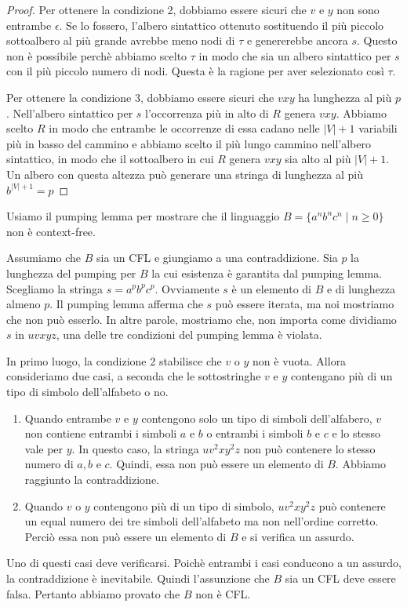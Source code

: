 \documentclass[12pt]{report}
\newcounter{lemma}
\begin{document}
\begin{proof}
Per ottenere la condizione 2, dobbiamo essere sicuri che $v$ e $y$ non sono entrambe $\epsilon$. Se lo fossero, l'albero sintattico ottenuto sostituendo il più piccolo sottoalbero al più grande avrebbe meno nodi di $\tau$ e genererebbe ancora $s$. Questo non è possibile perchè abbiamo scelto $\tau$ in modo che sia un albero sintattico per $s$ con il più piccolo numero di nodi. Questa è la ragione per aver selezionato così $\tau$.

Per ottenere la condizione 3, dobbiamo essere sicuri che $vxy$ ha lunghezza al più $p$. Nell'albero sintattico per $s$ l'occorrenza più in alto di $R$ genera $vxy$. Abbiamo scelto $R$ in modo che entrambe le occorrenze di essa cadano nelle $|V| + 1$ variabili più in basso del cammino e abbiamo scelto il più lungo cammino nell'albero sintattico, in modo che il sottoalbero in cui $R$ genera $vxy$ sia alto al più $|V| + 1$. Un albero con questa altezza può generare una stringa di lunghezza al più $b^{|V| + 1} = p$
\end{proof}
\begin{example}{}{}
Usiamo il pumping lemma per mostrare che il linguaggio $B = \{a^nb^nc^n \mid n \geq 0\}$ non è context-free.

Assumiamo che $B$ sia un CFL e giungiamo a una contraddizione. Sia $p$ la lunghezza del pumping per $B$ la cui esistenza è garantita dal pumping lemma. Scegliamo la stringa $s = a^pb^pc^p$. Ovviamente $s$ è un elemento di $B$ e di lunghezza almeno $p$. Il pumping lemma afferma che $s$ può essere iterata, ma noi mostriamo che non può esserlo. In altre parole, mostriamo che, non importa come dividiamo $s$ in $uvxyz$, una delle tre condizioni del pumping lemma è violata.

In primo luogo, la condizione 2 stabilisce che $v$ o $y$ non è vuota. Allora consideriamo due casi, a seconda che le sottostringhe $v$ e $y$ contengano più di un tipo di simbolo dell'alfabeto o no.
\begin{enumerate}
	\item Quando entrambe $v$ e $y$ contengono solo un tipo di simboli dell'alfabero, $v$ non contiene entrambi i simboli $a$ e $b$ o entrambi i simboli $b$ e $c$ e lo stesso vale per $y$. In questo caso, la stringa $uv^2xy^2z$ non può contenere lo stesso numero di $a, b$ e $c$. Quindi, essa non può essere un elemento di $B$. Abbiamo raggiunto la contraddizione.
	\item Quando $v$ o $y$ contengono più di un tipo di simbolo, $uv^2xy^2z$ può contenere un equal numero dei tre simboli dell'alfabeto ma non nell'ordine corretto. Perciò essa non può essere un elemento di $B$ e si verifica un assurdo.
\end{enumerate}
Uno di questi casi deve verificarsi. Poichè entrambi i casi conducono a un assurdo, la contraddizione è inevitabile. Quindi l'assunzione che $B$ sia un CFL deve essere falsa. Pertanto abbiamo provato che $B$ non è CFL.
\end{example}
\end{document}
